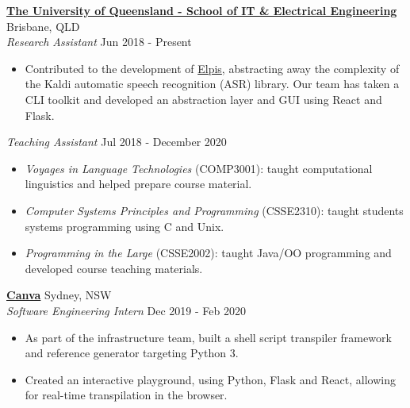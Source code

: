 \documentclass[a4paper]{article}
\newenvironment{myitemize}
{   \small
    \vspace{-2pt}
    \begin{itemize}
    \setlength{\itemsep}{0pt}
    \setlength{\parskip}{0pt}
    \setlength{\parsep}{0pt}     }
{ \end{itemize}                  }
\begin{document}
\textbf{\href{https://www.itee.uq.edu.au/}{The University of Queensland - School of IT \& Electrical Engineering}} \hfill Brisbane, QLD\\
\textit{Research Assistant} \hfill Jun 2018 - Present\\
\begin{myitemize} \itemsep 0.5mm
	\item Contributed to the development of \href{https://github.com/CoEDL/elpis}{Elpis}, abstracting away the complexity of the Kaldi automatic speech recognition (ASR) library. Our team has taken a CLI toolkit and developed an abstraction layer and GUI using React and Flask.
\end{myitemize}
\textit{Teaching Assistant} \hfill Jul 2018 - December 2020\\
\vspace{-0.5mm}
\begin{myitemize} \itemsep 0.5mm
	\item \textit{Voyages in Language Technologies} (COMP3001): taught computational linguistics and helped prepare course material.
	\item \textit{Computer Systems Principles and Programming} (CSSE2310): taught students systems programming using C and Unix.
	\item \textit{Programming in the Large} (CSSE2002): taught Java/OO programming and developed course teaching materials.
\end{myitemize}

\textbf{\href{https://www.canva.com/}{Canva}} \hfill Sydney, NSW\\
\textit{Software Engineering Intern} \hfill Dec 2019 - Feb 2020\\
\begin{myitemize} \itemsep 0.5mm
	\item As part of the infrastructure team, built a shell script transpiler framework and reference generator targeting Python 3.
	\item Created an interactive playground, using Python, Flask and React, allowing for real-time transpilation in the browser.
\end{myitemize}
\end{document}
